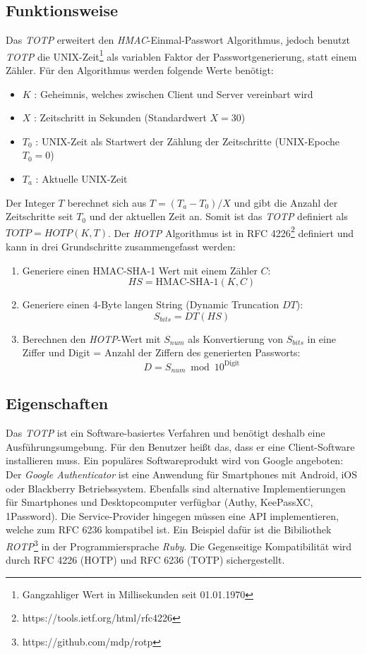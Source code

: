 \documentclass[11pt,a4paper,ngerman]{scrreprt}
\begin{document}
\subsection{Funktionsweise}
Das \textit{TOTP} erweitert den \textit{HMAC}-Einmal-Passwort Algorithmus, jedoch benutzt \textit{TOTP} die UNIX-Zeit\footnote{Gangzahliger Wert in Millisekunden seit 01.01.1970} als variablen Faktor der Passwortgenerierung, statt einem Zähler. Für den Algorithmus werden folgende Werte benötigt:
\begin{itemize}
    \item $K$ : Geheimnis, welches zwischen Client und Server vereinbart wird
    \item $X$ : Zeitschritt in Sekunden (Standardwert $X = 30$)
    \item $T_0$ : UNIX-Zeit als Startwert der Zählung der Zeitschritte (UNIX-Epoche $T_0 = 0$)
    \item $T_a$ : Aktuelle UNIX-Zeit
\end{itemize}
Der Integer $T$ berechnet sich aus $T = (T_a - T_0) / X$ und gibt die Anzahl der Zeitschritte seit $T_0$ und der aktuellen Zeit an. Somit ist das \textit{TOTP} definiert als $TOTP = HOTP(K, T)$. Der \textit{HOTP} Algorithmus ist in RFC 4226\footnote{https://tools.ietf.org/html/rfc4226} definiert und kann in drei Grundschritte zusammengefasst werden:
\begin{enumerate}
    \item Generiere einen HMAC-SHA-1 Wert mit einem Zähler $C$: 
    \[
        HS = \textrm{HMAC-SHA-1}(K, C)
    \]
    \item Generiere einen 4-Byte langen String (Dynamic Truncation $DT$): 
    \[
        S_{bits} = DT(HS)
    \]
    \item Berechnen den \textit{HOTP}-Wert mit $S_{num}$ als Konvertierung von $S_{bits}$ in eine Ziffer und Digit = Anzahl der Ziffern des generierten Passworts:
    \[
        D = S_{num} \bmod 10^{\textrm{Digit}}
    \]
\end{enumerate}
\subsection{Eigenschaften}
Das \textit{TOTP} ist ein Software-basiertes Verfahren und benötigt deshalb eine Ausführungsumgebung. Für den Benutzer heißt das, dass er eine Client-Software installieren muss. Ein populäres Softwareprodukt wird von Google angeboten: Der \textit{Google Authenticator} ist eine Anwendung für Smartphones mit Android, iOS oder Blackberry Betriebssystem. Ebenfalls sind alternative Implementierungen für Smartphones und Desktopcomputer verfügbar (Authy, KeePassXC, 1Password). Die Service-Provider hingegen müssen eine API implementieren, welche zum RFC 6236 kompatibel ist. Ein Beispiel dafür ist die Bibiliothek \textit{ROTP}\footnote{https://github.com/mdp/rotp} in der Programmiersprache \textit{Ruby}. Die Gegenseitige Kompatibilität wird durch RFC 4226 (HOTP) und RFC 6236 (TOTP) sichergestellt.
\end{document}
